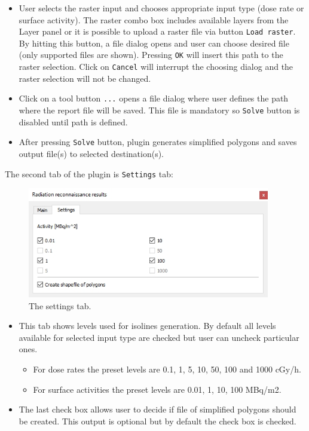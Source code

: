 \begin{itemize}
\item{User selects the raster input and chooses appropriate input type (dose
  rate or surface activity). The raster combo box includes available
  layers from the Layer panel or it is possible to upload a raster file
  via button \texttt{Load raster}. By hitting this button, a file
  dialog opens and user can choose desired file (only  supported
  files are shown). Pressing \texttt{OK} will insert this path to the
  raster selection. Click on \texttt{Cancel} will interrupt the choosing
  dialog and the raster selection will not be changed.}
\item{Click on a tool button \texttt{...} opens a file dialog where user
  defines the path where the report file will be saved. This file is
  mandatory so \texttt{Solve} button is disabled until path is defined.}
\item{After pressing \texttt{Solve} button, plugin generates simplified
  polygons and saves output file(s) to selected destination(s).}
\end{itemize}

\newpage
The second tab of the plugin is \texttt{Settings} tab:

\begin{figure}[H]
    \centering
      \includegraphics[width=300pt]{./pictures/settings_tab.jpg}
      \caption{The settings tab.}
      \label{fig:settings}
\end{figure}

\begin{itemize}
\item{This tab shows levels used for isolines generation. By default all
  levels available for selected input type are checked but user can
  uncheck particular ones.}
  	\begin{itemize}
		\item{For dose rates the preset levels are 0.1, 1, 5, 10, 50, 100 and 1000 cGy/h.}
		\item{For surface activities the preset levels are 0.01, 1, 10, 100 MBq/m2.}
	\end{itemize}
\item{The last check box allows user to decide if file of simplified
  polygons should be created. This output is optional but by default the
  check box is checked.}
\end{itemize}

